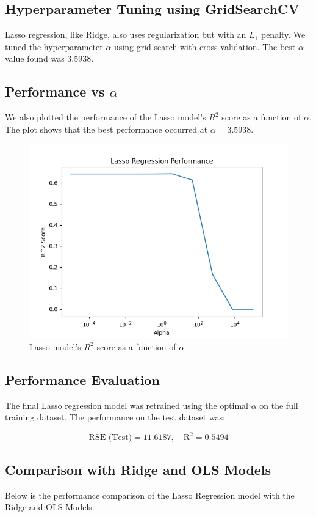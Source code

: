 \documentclass[a4paper,12pt]{article}
\begin{document}
\subsection*{Hyperparameter Tuning using GridSearchCV}
Lasso regression, like Ridge, also uses regularization but with an \(L_1\) penalty. We tuned the hyperparameter \(\alpha\) using grid search with cross-validation. The best \(\alpha\) value found was 3.5938.

\subsection*{Performance vs \(\alpha\)}
We also plotted the performance of the Lasso model's $R^2$ score as a function of \(\alpha\). The plot shows that the best performance occurred at \(\alpha = 3.5938\).
\begin{figure}[H]
    \centering
    \includegraphics[width=1\linewidth]{Results/Q3/lasso.png}
    \caption{Lasso model's $R^2$ score as a function of \(\alpha\)}
\end{figure}
\subsection*{Performance Evaluation}
The final Lasso regression model was retrained using the optimal \(\alpha\) on the full training dataset. The performance on the test dataset was:

\[
\text{RSE (Test)} = 11.6187, \quad \text{R}^2 = 0.5494
\]

\subsection*{Comparison with Ridge and OLS Models}
Below is the performance comparison of the Lasso Regression model with the Ridge and OLS Models:
\end{document}

